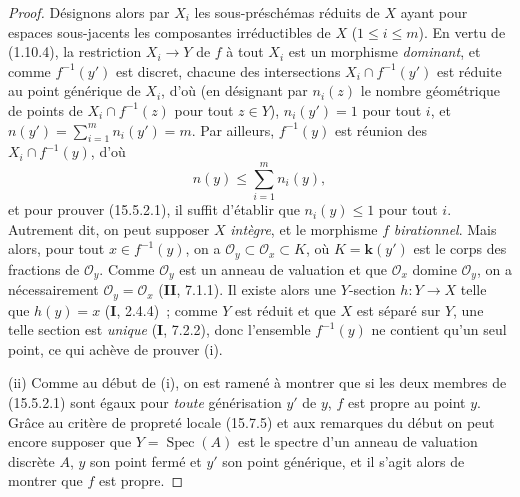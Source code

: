 \begin{proof}
Désignons alors par $X_i$ les sous-préschémas réduits de $X$ ayant pour espaces sous-jacents les composantes irréductibles de $X$ ($1\leqslant i\leqslant m$). En vertu de (1.10.4), la restriction $X_i\to Y$ de $f$ à tout $X_i$ est un morphisme \emph{dominant}, et comme $f^{-1}(y')$ est discret, chacune des intersections $X_i\cap f^{-1}(y')$ est réduite au point générique de $X_i$, d'où (en désignant par $n_i(z)$ le nombre géométrique de points de $X_i\cap f^{-1}(z)$ pour tout $z\in Y$), $n_i(y')=1$ pour tout $i$, et $n(y')=\sum_{i=1}^{m}n_i(y')=m$. Par ailleurs, $f^{-1}(y)$ est réunion des $X_i\cap f^{-1}(y)$, d'où
\begin{equation}
\tag{15.5.2.3}
\label{IV.15.5.2.3-fr}
  n(y)\leqslant\sum_{i=1}^{m}n_i(y),
\end{equation}
et pour prouver (15.5.2.1), il suffit d'établir que $n_i(y)\leqslant 1$ pour tout $i$. Autrement dit, on peut supposer $X$ \emph{intègre}, et le morphisme $f$ \emph{birationnel}. Mais alors, pour tout $x\in f^{-1}(y)$, on a $\mathcal O_y\subset\mathcal O_x\subset K$, où $K=\boldsymbol{k}(y')$ est le corps des fractions de $\mathcal O_y$. Comme $\mathcal O_y$ est un anneau de valuation et que $\mathcal O_x$ domine $\mathcal O_y$, on a nécessairement $\mathcal O_y=\mathcal O_x$ (\textbf{II}, 7.1.1). Il existe alors une $Y$-section $h:Y\to X$ telle que $h(y)=x$ (\textbf{I}, 2.4.4)~; comme $Y$ est réduit et que $X$ est séparé sur $Y$, une telle section est \emph{unique} (\textbf{I}, 7.2.2), donc l'ensemble $f^{-1}(y)$ ne contient qu'un seul point, ce qui achève de prouver (i).

(ii) Comme au début de (i), on est ramené à montrer que si les deux membres de (15.5.2.1) sont égaux pour \emph{toute} générisation $y'$ de $y$, $f$ est propre au point $y$. Grâce au critère de propreté locale (15.7.5) et aux remarques du début on peut encore supposer que $Y=\operatorname{Spec}(A)$ est le spectre d'un anneau de valuation discrète $A$, $y$ son point fermé et $y'$ son point générique, et il s'agit alors de montrer que $f$ est propre.


\end{proof}
